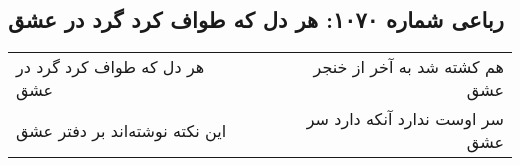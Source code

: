 \begin{center}
\section*{رباعی شماره ۱۰۷۰: هر دل که طواف کرد گرد در عشق}
\label{sec:1070}
\begin{longtable}{l p{0.5cm} r}
هر دل که طواف کرد گرد در عشق
&&
هم کشته شد به آخر از خنجر عشق
\\
این نکته نوشته‌اند بر دفتر عشق
&&
سر اوست ندارد آنکه دارد سر عشق
\\
\end{longtable}
\end{center}
